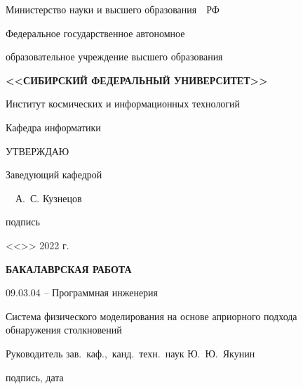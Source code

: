 \begin{spacing}{1}
    \setlength{\parindent}{0cm}

    \centerline{Министерство науки и высшего образования~~РФ}

    \centerline{\small Федеральное государственное автономное}

    \centerline{\small образовательное учреждение высшего образования}

    \centerline{\small\textbf{\MakeUppercase{<<Сибирский Федеральный Университет>>}}}

    \vspace{8pt}

    \centerline{{Институт космических и информационных технологий}}

    \centerline{{Кафедра информатики}}

    \vspace{10pt}

    \hfill\begin{minipage}{5.5cm}
        УТВЕРЖДАЮ

        Заведующий кафедрой

        \uline{\hfill}~~А.~С. Кузнецов

        \vspace{-4pt}
        {\footnotesize \hspace{2.1ex} подпись}

        <<\uline{\hspace{3ex}}>> \uline{\hspace{9ex}} 2022 г.
    \end{minipage}

    \vfill

    \centerline{\bf БАКАЛАВРСКАЯ РАБОТА}
    \vspace{8pt}
    \vspace{8pt}

    \centerline{{09.03.04 -- Программная инженерия}}
    \vspace{10pt}

    \begin{centering}

        {Система физического моделирования на основе априорного подхода}\\
        {обнаружения столкновений}

    \end{centering}

    \vfill
    \vfill
    \vfill

    Руководитель
    \hfill
    \uline{\hspace{10ex}}
    \hspace{3.5ex}
    {зав.~каф.,~канд.~техн.~наук}
    \hspace{2ex}
    {Ю.~Ю.~Якунин}
    \par
    \vspace{-4pt}
    \par
    \hfill
    {\footnotesize подпись, дата}
    \hspace{46.1ex}


\end{spacing}
